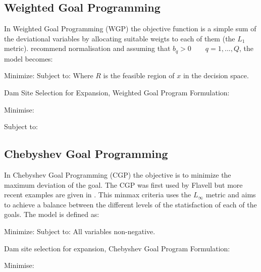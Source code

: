 \subsection{Weighted Goal Programming}
In Weighted Goal Programming (WGP) the objective function is a simple sum of the deviational variables by allocating suitable weigts to each of them (the $L_1 $ metric). \cite{jones2010} recommend normalisation and assuming that $b_q > 0 \qquad q = 1, ..., Q$, the model becomes:

Minimize:
            \EqWGPMinFunctionFive
Subject to:
            \EqGGPMinFunctionSubTwo
            \EqGGPMinFunctionSubThree
            \EqGGPMinFunctionSubFour
Where $R$ is the feasible region of $x$ in the decision space.

Dam Site Selection for Expansion, Weighted Goal Program Formulation:

Minimise:
        \EqDamWGPObjectiveEleven

Subject to:
        \EqDamHeightConstraintTwelve
        \EqDamCapacityConstraintThirteen
        \EqReservoirAreaConstraintFourteen
        \EqTemperatureConstraintFifteen
        \EqPopulationConstraintSixteen
        \EqRainfallConstraintSeventeen
        \EqResidenceConstraintEighteen
        \EqFarmlandDistanceConstraintNineteen
        \EqNearestRoadConstraintTwenty
        \EqFarmlandAreaConstraintTwentyOne
        \EqSelectThreeDamsTwentyTwo
        \EqBudgetConstraintTwentyThree

\subsection{Chebyshev Goal Programming}
In Chebyshev Goal Programming (CGP) the objective is to minimize the maximum deviation of the goal. The CGP was first used by Flavell \cite{FLAVELL1976} but more recent examples are given in \cite{Despotis2008,HO2019}. This minmax criteria uses the $L_\infty$ metric and aims to achieve a balance between the different levels of the statisfaction of each of the goals. The model is defined as:

Minimize:
            \EqCGPMinFunctionSix
Subject to:
            \EqGGPMinFunctionSubTwo
            \EqCGPConstraintSeven
            \EqCGPConstraintEight
            \EqGGPMinFunctionSubFour
            \EqCGPConstraintNine
All variables non-negative.

Dam site selection for expansion, Chebyshev Goal Program Formulation:

Minimise:
            \EqCGPMinFunctionSix

